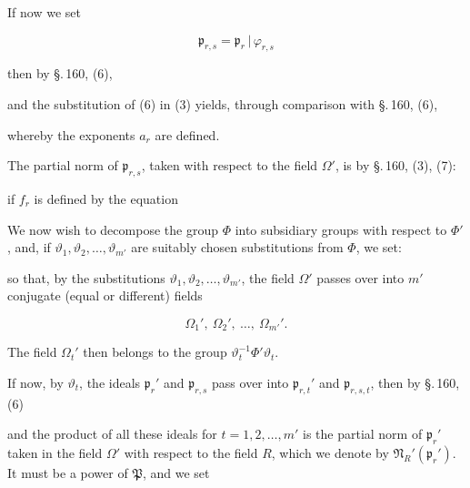 If now we set

\[
\mathfrak{p}_{r,s} = \mathfrak{p}_r\,|\,\varphi_{r,s}
\]

then by \S.\,160, (6),


and the substitution of (6) in (3) yields, through comparison
with \S.\,160, (6),


whereby the exponents $a_r$ are defined.

The partial norm of $\mathfrak{p}_{r,s}$, taken with respect to the field $\Omega'$,
is by \S.\,160, (3), (7):


if $f_r$ is defined by the equation


We now wish to decompose the group $\Phi$ into subsidiary groups
with respect to $\Phi'$, and, if $\vartheta_1, \vartheta_2, \ldots, \vartheta_{m'}$ are suitably
chosen substitutions from $\Phi$, we set:


so that, by the substitutions $\vartheta_1, \vartheta_2, \ldots, \vartheta_{m'}$, the field
$\Omega'$ passes over into $m'$ conjugate (equal or different) fields

\[
\Omega_1', \ \Omega_2', \ \ldots, \ \Omega_{m'}'.
\]

The field $\Omega_t'$ then belongs to the group $\vartheta_t^{-1}\Phi'\vartheta_t$.

If now, by $\vartheta_t$, the ideals $\mathfrak{p}_r'$ and $\mathfrak{p}_{r,s}$ pass over into $\mathfrak{p}_{r,t}'$ and
$\mathfrak{p}_{r,s,t}$, then by \S.\,160, (6)


and the product of all these ideals for $t = 1, 2, \ldots, m'$ is the
partial norm of $\mathfrak{p}_r'$ taken in the field $\Omega'$ with respect to the
field $R$, which we denote by $\mathfrak{N}_R'(\mathfrak{p}_r')$. It must be a power
of $\mathfrak{P}$, and we set


